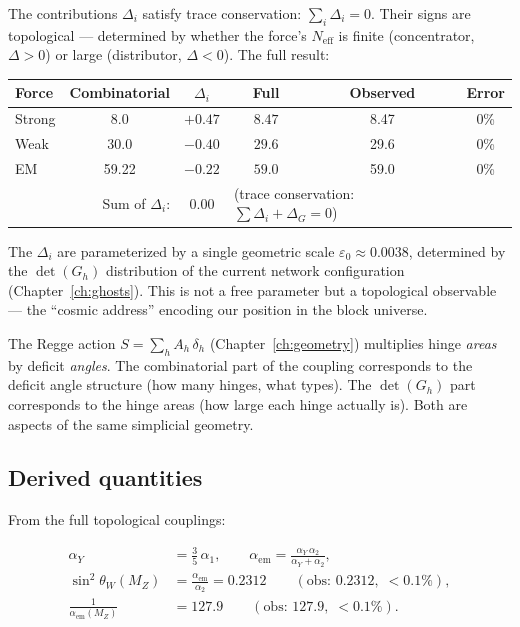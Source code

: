 The contributions $\Delta_i$ satisfy trace conservation: $\sum_i \Delta_i = 0$. Their signs are topological --- determined by whether the force's $N_\text{eff}$ is finite (concentrator, $\Delta > 0$) or large (distributor, $\Delta < 0$). The full result:

\begin{center}
\begin{tabular}{lccccc}
\hline
Force & Combinatorial & $\Delta_i$ & Full & Observed & Error \\
\hline
Strong & 8.0 & $+0.47$ & $\mathbf{8.47}$ & 8.47 & 0\% \\
Weak & 30.0 & $-0.40$ & $\mathbf{29.6}$ & 29.6 & 0\% \\
EM & 59.22 & $-0.22$ & $\mathbf{59.0}$ & 59.0 & 0\% \\
\hline
\multicolumn{2}{r}{Sum of $\Delta_i$:} & $\mathbf{0.00}$ & \multicolumn{2}{l}{(trace conservation: $\sum\Delta_i + \Delta_G = 0$)} \\
\hline
\end{tabular}
\end{center}

The $\Delta_i$ are parameterized by a single geometric scale $\varepsilon_0 \approx 0.0038$, determined by the $\det(G_h)$ distribution of the current network configuration (Chapter~\ref{ch:ghosts}). This is not a free parameter but a topological observable --- the ``cosmic address'' encoding our position in the block universe.

\begin{remark}
The Regge action $S = \sum_h A_h\,\delta_h$ (Chapter~\ref{ch:geometry}) multiplies hinge \emph{areas} by deficit \emph{angles}. The combinatorial part of the coupling corresponds to the deficit angle structure (how many hinges, what types). The $\det(G_h)$ part corresponds to the hinge areas (how large each hinge actually is). Both are aspects of the same simplicial geometry.
\end{remark}

\subsection{Derived quantities}

From the full topological couplings:

\begin{align}
\alpha_Y &= \tfrac{3}{5}\,\alpha_1, \qquad \alpha_\text{em} = \frac{\alpha_Y\,\alpha_2}{\alpha_Y + \alpha_2}, \\
\sin^2\theta_W(M_Z) &= \frac{\alpha_\text{em}}{\alpha_2} = 0.2312 \qquad (\text{obs: } 0.2312,\; <0.1\%), \\
\frac{1}{\alpha_\text{em}(M_Z)} &= 127.9 \qquad (\text{obs: } 127.9,\; <0.1\%).
\end{align}

